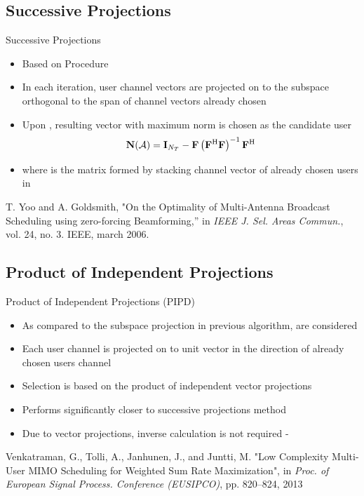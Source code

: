 \documentclass[11pt]{beamer}
\begin{document}
\subsection{Successive Projections}

\begin{frame}{Successive Projections\eqn{^\dagger}}
	\begin{itemize}
		\item Based on  Procedure
		\item In each iteration, user channel vectors are projected on to the subspace orthogonal to the span of channel vectors already chosen
		\item Upon , resulting vector with maximum norm is chosen as the candidate user
		\[\mathbf{N}(\mathcal{A}) = \mathbf{I}_{N_T} - \mathbf{F} \left (\mathbf{F}^{\mathrm{H}} \mathbf{F} \right )^{-1} \mathbf{F}^{\mathrm{H}}\]
		\item where  is the matrix formed by stacking channel vector of already chosen users in 
	\end{itemize}
	\eqn{^\dagger}\scriptsize{T. Yoo and A. Goldsmith, "{On the Optimality of Multi-Antenna Broadcast Scheduling using zero-forcing Beamforming},” in \emph{IEEE J. Sel. Areas Commun.}, vol. 24, no. 3. IEEE, march 2006.}
\end{frame}

\subsection{Product of Independent Projections}

\begin{frame}{Product of Independent Projections (PIPD)\eqn{^\dagger}}
	\begin{itemize}
		\item As compared to the subspace projection in previous algorithm,  are considered
		\item Each user channel is projected on to unit vector in the direction of already chosen users channel
		\item Selection is based on the product of independent vector projections
		\item Performs significantly closer to successive projections method
		\item Due to vector projections, inverse calculation is not required - 
	\end{itemize}
	\eqn{^\dagger}\scriptsize{Venkatraman, G., Tolli, A., Janhunen, J., and Juntti, M. "Low Complexity Multi-User MIMO Scheduling for Weighted Sum Rate Maximization", in \emph{Proc. of European Signal Process. Conference (EUSIPCO)}, pp. 820--824, 2013}
\end{frame}
\end{document}
